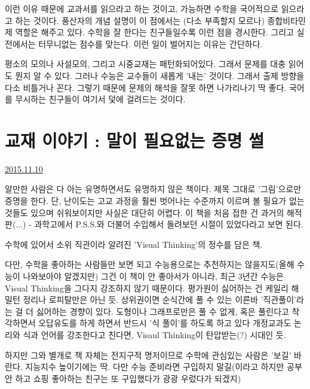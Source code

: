 이런 이유 때문에 교과서를 읽으라고 하는 것이고, 가능하면 수학을 국어적으로 읽으라고 하는 것이다.
풍산자의 개념 설명이 이 점에서는 (다소 부족할지 모르나) 종합비타민제 역할은 해주고 있다.
수학을 잘 한다는 친구들일수록 이런 점을 경시한다. 그리고 실전에서는 터무니없는 점수를 맞는다.
이런 일이 벌어지는 이유는 간단하다.
\vspace{5mm}

평소의 모의나 사설모의, 그리고 시중교재는 패턴화되어있다. 그래서 문제를 대충 읽어도 뭔지 알 수 있다.
그러나 수능은 교수들이 새롭게 '내는' 것이다. 그래서 출제 방향을 다소 비틀거나 꼰다.
그렇기 때문에 문제의 해석을 잘못 하면 나가리나기 딱 좋다. 국어를 무시하는 친구들이 여기서 덫에 걸려드는 것이다.
\vspace{5mm}





\section{교재 이야기 : 말이 필요없는 증명 썰}


\href{https://www.kockoc.com/Apoc/472719}{2015.11.10}


알만한 사람은 다 아는 유명하면서도 유명하지 않은 책이다.
제목 그대로 '그림'으로만 증명을 한다.
단, 난이도는 고교 과정을 훨씬 벗어나는 수준까지 이르며 볼 필요가 없는 것들도 있으며
쉬워보이지만 사실은 대단히 어렵다.
이 책을 처음 접한 건 과거의 해적판(...) - 과학고에서 P.S.S.와 더불어 수입해서 돌려보던 시절이 있었다라고 보면 된다.

\vspace{5mm}


수학에 있어서 소위 직관이라 알려진 'Visual Thinking'의 정수를 담은 책.
\vspace{5mm}


다만, 수학을 좋아하는 사람들만 보면 되고 수능용으로는 추천하지는 않을지도(올해 수능이 나와보아야 알겠지만)
그건 이 책이 안 좋아서가 아니라, 최근 3년간 수능은 Visual Thinking을 그다지 강조하지 않기 때문이다.
평가원이 싫어하는 건 케일리 해밀턴 정리나 로피탈만은 아닌 듯.
상위권이면 순식간에 풀 수 있는 이른바 '직관풀이'라는 걸 더 싫어하는 경향이 있다.
도형이나 그래프로만은 풀 수 없게, 혹은 풀린다고 착각하면서 오답유도를 하게 하면서 반드시 '식 풀이'를 하도록 하고 있다
개정교과도 논리와 식과 언어를 강조한다고 친다면, Visaul Thinking이 탄압받는(?) 시대인 듯.
\vspace{5mm}


하지만 그와 별개로 책 자체는 전지구적 명저이므로 수학에 관심있는 사람은 '보길' 바란다.
지능지수 높이기에는 딱.
다만 수능 준비라면 구입하지 말길(이라고 하지만 공부 안 하고 쇼핑 좋아하는 친구는 또 구입했다가 광광 우렀다가 되겠지)






